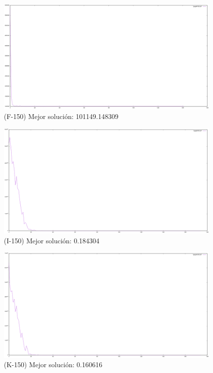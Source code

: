 \documentclass{article}
\begin{document}
  \begin{figure}[!h]
    \includegraphics[scale=0.35]{F150}
    \caption{(F-150) Mejor solución: 101149.148309} 
  \end{figure}
  \begin{figure}[!h]
    \includegraphics[scale=0.35]{I150}
    \caption{(I-150) Mejor solución: 0.184304} 
  \end{figure}
  \begin{figure}[!h]
    \includegraphics[scale=0.35]{K150}
    \caption{(K-150) Mejor solución: 0.160616} 
  \end{figure}
\end{document}
